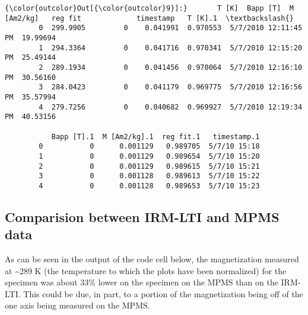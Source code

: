 \documentclass{article}
\begin{document}
            \begin{Verbatim}[commandchars=\\\{\}]
{\color{outcolor}Out[{\color{outcolor}9}]:}       T [K]  Bapp [T]  M [Am2/kg]   reg fit             timestamp   T [K].1  \textbackslash{}
        0  299.9905         0    0.041991  0.970553  5/7/2010 12:11:45 PM  19.99694   
        1  294.3364         0    0.041716  0.970341  5/7/2010 12:15:20 PM  25.49144   
        2  289.1934         0    0.041456  0.970064  5/7/2010 12:16:10 PM  30.56160   
        3  284.0423         0    0.041179  0.969775  5/7/2010 12:16:56 PM  35.57994   
        4  279.7256         0    0.040682  0.969927  5/7/2010 12:19:34 PM  40.53156   
        
           Bapp [T].1  M [Am2/kg].1  reg fit.1   timestamp.1  
        0           0      0.001129   0.989705  5/7/10 15:18  
        1           0      0.001129   0.989654  5/7/10 15:20  
        2           0      0.001129   0.989615  5/7/10 15:21  
        3           0      0.001128   0.989613  5/7/10 15:22  
        4           0      0.001128   0.989653  5/7/10 15:23  
\end{Verbatim}
        

    \subsection{Comparision between IRM-LTI and MPMS data}


    As can be seen in the output of the code cell below, the magnetization
measured at \textasciitilde{}289 K (the temperature to which the plots
have been normalized) for the specimen was about 33\% lower on the
specimen on the MPMS than on the IRM-LTI. This could be due, in part, to
a portion of the magnetization being off of the one axis being measured
on the MPMS.
\end{document}
